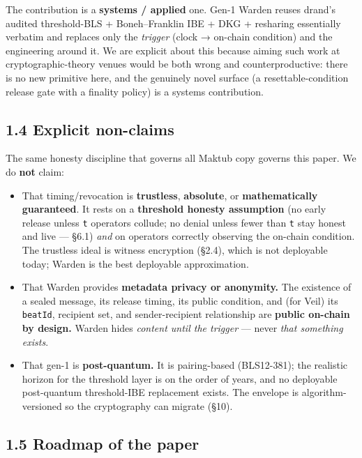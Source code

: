 \documentclass[
  11pt,
]{article}
\providecommand{\tightlist}{%
  \setlength{\itemsep}{0pt}\setlength{\parskip}{0pt}}
\begin{document}
The contribution is a \textbf{systems / applied} one. Gen-1 Warden
reuses drand's audited threshold-BLS + Boneh--Franklin IBE + DKG +
resharing essentially verbatim and replaces only the \emph{trigger}
(clock → on-chain condition) and the engineering around it. We are
explicit about this because aiming such work at cryptographic-theory
venues would be both wrong and counterproductive: there is no new
primitive here, and the genuinely novel surface (a resettable-condition
release gate with a finality policy) is a systems contribution.

\subsection{1.4 Explicit non-claims}\label{explicit-non-claims}

The same honesty discipline that governs all Maktub copy governs this
paper. We do \textbf{not} claim:

\begin{itemize}
\tightlist
\item
  That timing/revocation is \textbf{trustless}, \textbf{absolute}, or
  \textbf{mathematically guaranteed}. It rests on a \textbf{threshold
  honesty assumption} (no early release unless \texttt{t} operators
  collude; no denial unless fewer than \texttt{t} stay honest and live
  --- §6.1) \emph{and} on operators correctly observing the on-chain
  condition. The trustless ideal is witness encryption (§2.4), which is
  not deployable today; Warden is the best deployable approximation.
\item
  That Warden provides \textbf{metadata privacy or anonymity.} The
  existence of a sealed message, its release timing, its public
  condition, and (for Veil) its \texttt{beatId}, recipient set, and
  sender-recipient relationship are \textbf{public on-chain by design.}
  Warden hides \emph{content until the trigger} --- never \emph{that
  something exists}.
\item
  That gen-1 is \textbf{post-quantum.} It is pairing-based (BLS12-381);
  the realistic horizon for the threshold layer is on the order of
  years, and no deployable post-quantum threshold-IBE replacement
  exists. The envelope is algorithm-versioned so the cryptography can
  migrate (§10).
\end{itemize}

\subsection{1.5 Roadmap of the paper}\label{roadmap-of-the-paper}
\end{document}

